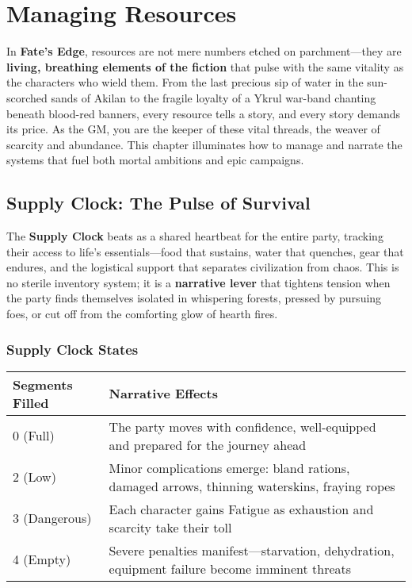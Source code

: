 \chapter{Managing Resources}

In \textbf{Fate's Edge}, resources are not mere numbers etched on parchment---they are \textbf{living, breathing elements of the fiction} that pulse with the same vitality as the characters who wield them. From the last precious sip of water in the sun-scorched sands of Akilan to the fragile loyalty of a Ykrul war-band chanting beneath blood-red banners, every resource tells a story, and every story demands its price. As the GM, you are the keeper of these vital threads, the weaver of scarcity and abundance. This chapter illuminates how to manage and narrate the systems that fuel both mortal ambitions and epic campaigns.

\section*{Supply Clock: The Pulse of Survival}

The \textbf{Supply Clock} beats as a shared heartbeat for the entire party, tracking their access to life's essentials---food that sustains, water that quenches, gear that endures, and the logistical support that separates civilization from chaos. This is no sterile inventory system; it is a \textbf{narrative lever} that tightens tension when the party finds themselves isolated in whispering forests, pressed by pursuing foes, or cut off from the comforting glow of hearth fires.

\subsection*{Supply Clock States}

\begin{fatebox}
\begin{tabularx}{\textwidth}{lX}
\toprule
\textbf{Segments Filled} & \textbf{Narrative Effects} \\
\midrule
0 (Full) & The party moves with confidence, well-equipped and prepared for the journey ahead \\
2 (Low) & Minor complications emerge: bland rations, damaged arrows, thinning waterskins, fraying ropes \\
3 (Dangerous) & Each character gains Fatigue as exhaustion and scarcity take their toll \\
4 (Empty) & Severe penalties manifest—starvation, dehydration, equipment failure become imminent threats \\
\bottomrule
\end{tabularx}
\end{fatebox}

